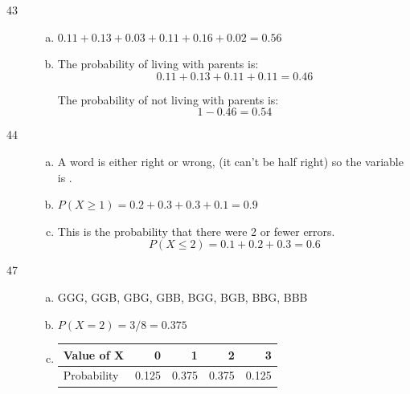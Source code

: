\documentclass[letterpaper]{exam}
\begin{document}
\begin{description}
\begin{enumerate}[(a)]
        \end{enumerate}  

      \item[43]
        \begin{enumerate}[(a)]
          \item $0.11 + 0.13 + 0.03 + 0.11 + 0.16 + 0.02 = \boxed{ 0.56 }$

          \item The probability of living with parents is:
            \[
              0.11 + 0.13 + 0.11 + 0.11 = 0.46
            \]

            The probability of not living with parents is:
            \[
              1 - 0.46 = \boxed{ 0.54 }
            \]
        \end{enumerate}  

      \item[44]
        \begin{enumerate}[(a)]
          \item A word is either right or wrong, (it can't be half right) so the
            variable is .

          \item $P(X \geq 1) = 0.2 + 0.3 + 0.3 + 0.1 = \boxed{ 0.9 }$

          \item This is the probability that there were 2 or fewer errors.
          \[
            P(X \leq 2) = 0.1 + 0.2 + 0.3 = \boxed{ 0.6 }
          \]
        \end{enumerate}  


      \item[47]
        \begin{enumerate}[(a)]
          \item GGG, GGB, GBG, GBB, BGG, BGB, BBG, BBB
          \item $P(X = 2) = 3/8 = \boxed{ 0.375 }$

          \item
            \begin{tabular}[H]{lrrrr}
              \toprule
              Value of X  & 0     & 1     & 2     & 3 \\
              \midrule
              Probability & 0.125 & 0.375 & 0.375 & 0.125 \\
              \bottomrule
            \end{tabular}
        \end{enumerate}  


\end{description}
\end{document}

